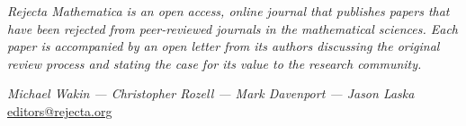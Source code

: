 \documentclass[11pt,oneside]{article}
\begin{document}
\hfill

\noindent\small{\emph{Rejecta Mathematica is an open access, online journal that publishes papers that have been rejected from peer-reviewed journals in the mathematical sciences. Each paper is accompanied by an open letter from its authors discussing the original review process and stating the case for its value to the research community.}}

\hfill

\vspace{-1cm}
\begin{center}
\tableofcontents
\end{center}

\noindent \hrulefill



\begin{flushright}
\emph{Michael  Wakin --- Christopher  Rozell --- Mark  Davenport --- Jason  Laska}\\
%
%
\href{mailto:editors@rejecta.org}{{\footnotesize \textsf{editors@rejecta.org}}}\\
\end{flushright}


\newpage










\fancyfoot{} %
\fancyfoot[R]{\thepage}
\renewcommand{\footrulewidth}{0.4pt}
\end{document}
